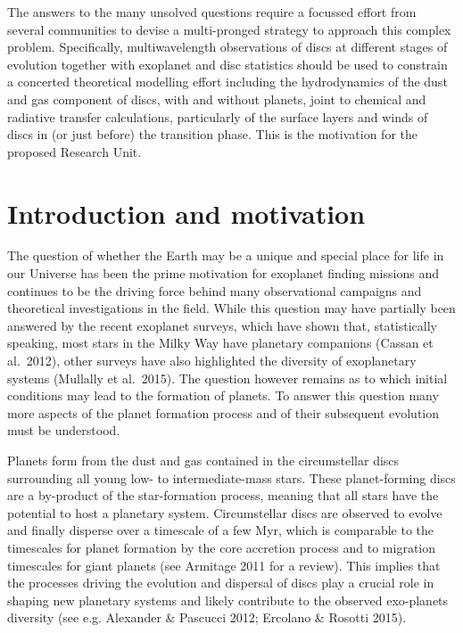 \documentclass[12pt]{article}
\begin{document}
The answers to the many unsolved questions require a focussed effort from
several communities to devise a multi-pronged strategy to approach this
complex problem. Specifically, multiwavelength observations of discs at
different stages of evolution together with exoplanet and disc statistics
should be used to constrain a concerted theoretical modelling effort
including the hydrodynamics of the dust and gas component of discs, with and
without planets, joint to chemical and radiative transfer calculations,
particularly of the surface layers and winds of discs in (or just
before) the transition phase. This is the motivation for the proposed Research Unit.


\section*{Introduction and motivation}

The question of whether the Earth may be a unique and special place for life
in our Universe has been the prime motivation for exoplanet finding missions
and continues to be the driving force behind many observational campaigns and
theoretical investigations in the field. While this question may have
partially been answered by the recent exoplanet surveys, which have shown
 that, statistically speaking, most stars in the Milky Way have planetary
  companions (Cassan et al.\ 2012), other surveys have
also highlighted the diversity of exoplanetary systems (Mullally et
  al.\ 2015). The question however remains as to which
initial conditions may lead to the formation of planets. To answer
this question many more aspects of the planet formation process and of their
subsequent evolution must be understood.

Planets form from the dust and gas contained in the circumstellar discs surrounding all young low- to intermediate-mass stars. These planet-forming discs are a by-product of the star-formation process, meaning that all stars have the potential to host a planetary system.
Circumstellar discs are observed to evolve and finally disperse over a
timescale of a few Myr, which is comparable to
the timescales for planet formation by the core accretion process
 and to migration timescales for giant planets
(see Armitage 2011 for a review). This implies that the processes driving the
evolution and dispersal of discs play a crucial role in shaping new
planetary systems and likely contribute to the observed exo-planets
diversity (see e.g. Alexander \& Pascucci 2012; Ercolano \& Rosotti
2015).  
\end{document}
